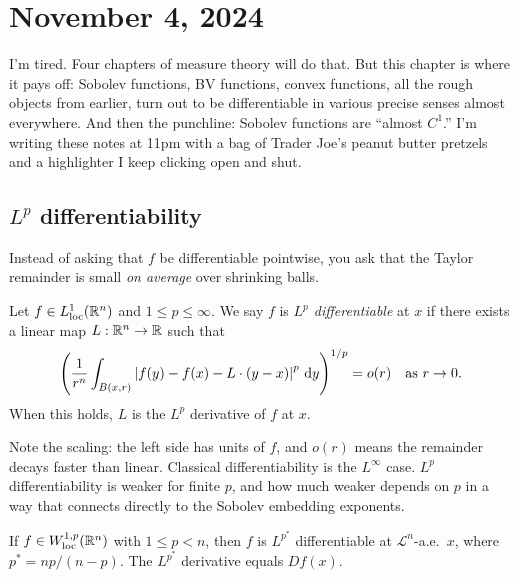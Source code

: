 
\section{November 4, 2024}\label{sec:nov4}

I'm tired. Four chapters of measure theory will do that. But this chapter is where it pays off: Sobolev functions, BV functions, convex functions, all the rough objects from earlier, turn out to be differentiable in various precise senses almost everywhere. And then the punchline: Sobolev functions are ``almost $C^1$.'' I'm writing these notes at 11pm with a bag of Trader Joe's peanut butter pretzels and a highlighter I keep clicking open and shut.

\subsection{$L^p$ differentiability}\label{subsec:lp-diff}

Instead of asking that $f$ be differentiable pointwise, you ask that the Taylor remainder is small \emph{on average} over shrinking balls.

\begin{definition}[$L^p$ differentiability]\label{def:lp-diff}
Let $f \in L^1_{\mathrm{loc}}(\mathbb{R}^n)$ and $1 \le p \le \infty$. We say $f$ is \emph{$L^p$ differentiable} at $x$ if there exists a linear map $L : \mathbb{R}^n \to \mathbb{R}$ such that
\[
    \left( \frac{1}{r^n} \int_{B(x,r)} \left|f(y) - f(x) - L \cdot (y - x)\right|^p \,\mathrm{d} y \right)^{1/p} = o(r)
    \quad \text{as } r \to 0.
\]
When this holds, $L$ is the $L^p$ derivative of $f$ at $x$.
\end{definition}

Note the scaling: the left side has units of $f$, and $o(r)$ means the remainder decays faster than linear. Classical differentiability is the $L^\infty$ case. $L^p$ differentiability is weaker for finite $p$, and how much weaker depends on $p$ in a way that connects directly to the Sobolev embedding exponents.

\begin{theorem}\label{thm:lp-diff-sobolev}
If $f \in W^{1,p}_{\mathrm{loc}}(\mathbb{R}^n)$ with $1 \le p < n$, then $f$ is $L^{p^*}$ differentiable at $\mathcal{L}^n$-a.e.\ $x$, where $p^* = np/(n-p)$. The $L^{p^*}$ derivative equals $Df(x)$.
\end{theorem}

